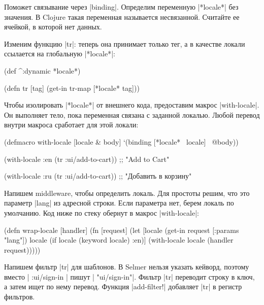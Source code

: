 Поможет связывание через \spverb|binding|. Определим переменную
\spverb|*locale*| без значения. В Clojure такая переменная называется
несвязанной. Считайте ее ячейкой, в которой нет данных.

Изменим функцию \spverb|tr|: теперь она принимает только тег, а в качестве
локали ссылается на глобальную \spverb|*locale*|:

\begin{english}
  \begin{clojure}
(def ^:dynamic *locale*)

(defn tr [tag]
  (get-in tr-map [*locale* tag]))
  \end{clojure}
\end{english}

Чтобы изолировать \spverb|*locale*| от внешнего кода, предоставим макрос
\spverb|with-locale|. Он выполняет тело, пока переменная связана с заданной
локалью. Любой перевод внутри макроса сработает для этой локали:

  \begin{clojure}
(defmacro with-locale
  [locale & body]
  `(binding [*locale* ~locale]
     ~@body))

(with-locale :en
  (tr :ui/add-to-cart))
;; "Add to Cart"

(with-locale :ru
  (tr :ui/add-to-cart))
;; "Добавить в корзину"
  \end{clojure}

Напишем middleware, чтобы определить локаль. Для простоты решим, что это
параметр \spverb|lang| из адресной строки. Если параметра нет, берем локаль по
умолчанию. Код ниже по стеку обернут в макрос \spverb|with-locale|:

\begin{english}
  \begin{clojure}
(defn wrap-locale [handler]
  (fn [request]
    (let [locale (get-in request [:params "lang"])
          locale (if locale
                   (keyword locale)
                   :en)]
      (with-locale locale
        (handler request)))))
  \end{clojure}
\end{english}

Напишем фильтр \spverb|tr| для шаблонов. В Selmer нельзя указать кейворд,
поэтому вместо \spverb|{{ :ui/sign-in }}| пишут \spverb|{{ "ui/sign-in"}}|.
Фильтр \spverb|tr| переводит строку в ключ, а затем ищет по нему
перевод. Функция \spverb|add-filter!| добавляет \spverb|tr| в регистр фильтров.

